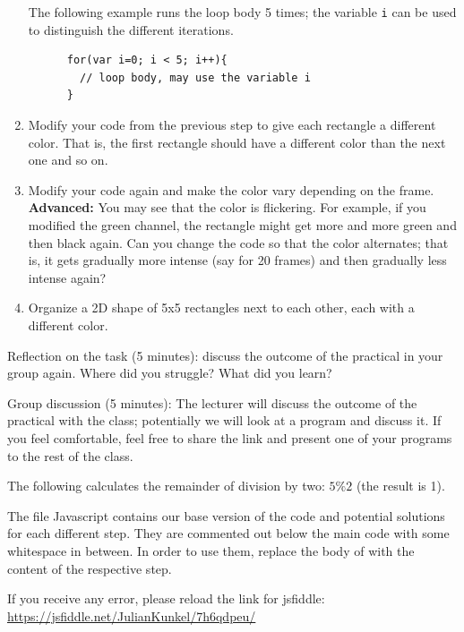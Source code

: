 \begin{steps}
\begin{enumerate}
  The following example runs the loop body 5 times; the variable \texttt{i} can be used to distinguish the different iterations.
    \begin{lstlisting}
      for(var i=0; i < 5; i++){
        // loop body, may use the variable i
      }
    \end{lstlisting}

  \item Modify your code from the previous step to give each rectangle a different color. That is, the first rectangle should have a different color than the next one and so on.

  \item Modify your code again and make the color vary depending on the frame.
  \textbf{Advanced:} You may see that the color is flickering. For example, if you modified the green channel, the rectangle might get more and more green and then black again.
  Can you change the code so that the color alternates; that is, it gets gradually more intense (say for 20 frames) and then gradually less intense again?

  \item Organize a 2D shape of 5x5 rectangles next to each other, each with a different color.
  \end{enumerate}

\item Reflection on the task (5 minutes): discuss the outcome of the practical in your group again. Where did you struggle? What did you learn?
\item Group discussion (5 minutes): The lecturer will discuss the outcome of the practical with the class; potentially we will look at a program and discuss it.
If you feel comfortable, feel free to share the link and present one of your programs to the rest of the class.
\end{steps}


\begin{hints}
  \item The following calculates the remainder of division by two: $5 \% 2$ (the result is 1).

  \item The file Javascript contains our base version of the code and potential solutions for each different step.
  They are commented out below the main code with some whitespace in between.
  In order to use them, replace the body of  with the content of the respective step.

  \item If you receive any error, please reload the link for jsfiddle:
  \url{https://jsfiddle.net/JulianKunkel/7h6qdpeu/}
\end{hints}


